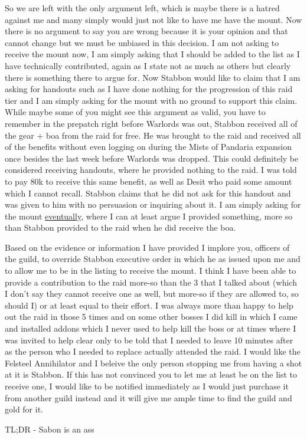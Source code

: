 \documentclass[9pt,letterpaper]{article}
\begin{document}
So we are left with the only argument left, which is maybe there is a hatred against me and many simply would just not like to have me have the mount. Now there is no argument to say you are wrong because it is your opinion and that cannot change but we must be unbiased in this decision. I am not asking to receive the mount now, I am simply asking that I should be added to the list as I have technically contributed, again as I state not as much as others but clearly there is something there to argue for. Now Stabbon would like to claim that I am asking for handouts such as I have done nothing for the progression of this raid tier and I am simply asking for the mount with no ground to support this claim. While maybe some of you might see this argument as valid, you have to remember in the prepatch right before Warlords was out, Stabbon received all of the gear + boa from the raid for free. He was brought to the raid and received all of the benefits without even logging on during the Mists of Pandaria expansion once besides the last week before Warlords was dropped. This could definitely be considered receiving handouts, where he provided nothing to the raid. I was told to pay 80k to receive this same benefit, as well as Desit who paid some amount which I cannot recall. Stabbon claims that he did not ask for this handout and was given to him with no persuasion or inquiring about it. I am simply asking for the mount \underline{eventually}, where I can at least argue I provided something, more so than Stabbon provided to the raid when he did receive the boa.\vspace{0.5cm}

Based on the evidence or information I have provided I implore you, officers of the guild, to override Stabbon executive order in which he as issued upon me and to allow me to be in the listing to receive the mount. I think I have been able to provide a contribution to the raid more-so than the 3 that I talked about (which I don't say they cannot receive one as well, but more-so if they are allowed to, so should I) or at least equal to their effort. I was always more than happy to help out the raid in those 5 times and on some other bosses I did kill in which I came and installed addons which I never used to help kill the boss or at times where I was invited to help clear only to be told that I needed to leave 10 minutes after as the person who I needed to replace actually attended the raid. I would like the Felsteel Annihilator and I beleive the only person stopping me from having a shot at it is Stabbon. If this has not convinced you to let me at least be on the list to receive one, I would like to be notified immediately as I would just purchase it from another guild instead and it will give me ample time to find the guild and gold for it. 

TL;DR - Sabon is an ass
\end{document}
